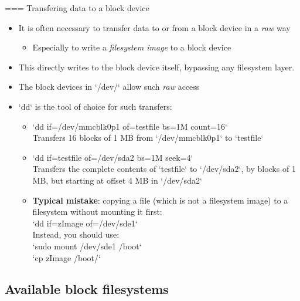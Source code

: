 === {Transfering data to a block device}
  \begin{itemize}
  \item It is often necessary to transfer data to or from a block
    device in a {\em raw} way
    \begin{itemize}
    \item Especially to write a {\em filesystem image} to a block
      device
    \end{itemize}
  \item This directly writes to the block device itself, bypassing any
    filesystem layer.
  \item The block devices in `/dev/` allow such {\em raw} access
  \item `dd` is the tool of choice for such transfers:
    \begin{itemize}
    \item `dd if=/dev/mmcblk0p1 of=testfile bs=1M count=16`\\
      Transfers 16 blocks of 1 MB from `/dev/mmcblk0p1` to
      `testfile`
    \item `dd if=testfile of=/dev/sda2 bs=1M seek=4`\\
      Transfers the complete contents of `testfile` to
      `/dev/sda2`, by blocks of 1 MB, but starting at offset 4 MB
      in `/dev/sda2`
    \item {\bf Typical mistake}: copying a file (which is not a
          filesystem image) to a filesystem without
          mounting it first:\\
      `dd if=zImage of=/dev/sde1`\\
      Instead, you should use:\\
      `sudo mount /dev/sde1 /boot`\\
      `cp zImage /boot/`\\
    \end{itemize}
  \end{itemize}


\subsection{Available block filesystems}

